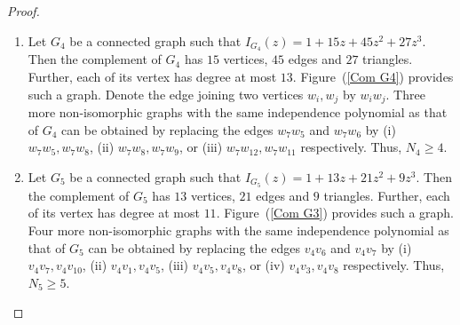 \documentclass[12pt,a4paper]{article}
\theoremstyle{plain}
\numberwithin{equation}{section}
\begin{document}
\begin{proof}
\begin{enumerate}
	\item 	 Let \(G_4\) be a connected graph such that \(I_{G_4}(z)=1+15z+45z^2+27z^3 \). Then the complement of \(G_4\) has $15$ vertices,  \(45\) edges and $27$ triangles. Further, each of its vertex has degree at most $13$. Figure~(\ref{Com G4}) provides such a graph.  Denote the edge joining two vertices $w_i, w_j$ by $w_i w_j$. Three more non-isomorphic graphs with the same independence polynomial as that of $G_4$ can be obtained by replacing the edges  $w_7 w_5$ and $w_7 w_6$ by (i) $w_7 w_5, w_7 w_{8}$, (ii) $w_7 w_8, w_7 w_9$,  or (iii) $w_7 w_{12}, w_7  w_{11}$ respectively. Thus, $N_4 \geq 4$.  
		\item Let \(G_5\) be a connected graph such that \(I_{G_5}(z)=1+13z+21z^2+9z^3\). Then the complement of \(G_5\) has $13$ vertices,  \(21\) edges and $9$ triangles. Further, each of its vertex has degree at most $11$. Figure~(\ref{Com G3}) provides such a graph. Four more non-isomorphic graphs with the same independence polynomial as that of $G_5$ can be obtained by replacing the edges  $v_4 v_6$ and $v_4 v_7$ by (i) $v_4 v_7, v_4 v_{10}$, (ii) $v_4 v_1, v_4 v_5$, (iii) $v_4 v_5, v_4  v_8$, or (iv) $v_4 v_3, v_4 v_8$ respectively. Thus, $N_5 \geq 5$.
			\end{enumerate}


\end{proof}
\end{document}
